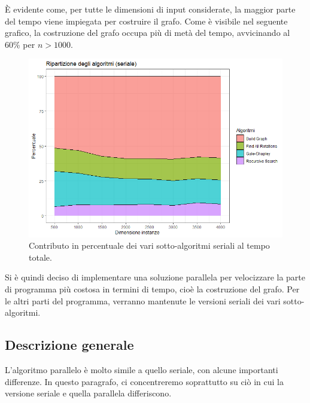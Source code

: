 \documentclass[12pt]{article}
\begin{document}
        È evidente come, per tutte le dimensioni di input considerate, la maggior parte del tempo viene impiegata per costruire il grafo. Come è visibile nel seguente grafico, la costruzione del grafo occupa più di metà del tempo, avvicinando al 60\% per $n>1000$.
        \FloatBarrier
        
        \begin{figure}[h]
            \centering
            \includegraphics[scale=0.7]{algs_contributes.png}
            \caption{Contributo in percentuale dei vari sotto-algoritmi seriali al tempo totale.}
            \label{fig:contributi}
        \end{figure}
        \FloatBarrier
        
        Si è quindi deciso di implementare una soluzione parallela per velocizzare la parte di programma più costosa in termini di tempo, cioè la costruzione del grafo. Per le altri parti del programma, verranno mantenute le versioni seriali dei vari sotto-algoritmi.

    \subsection{Descrizione generale}
    L'algoritmo parallelo è molto simile a quello seriale, con alcune importanti differenze. In questo paragrafo, ci concentreremo soprattutto su ciò in cui la versione seriale e quella parallela differiscono.
    
\end{document}
